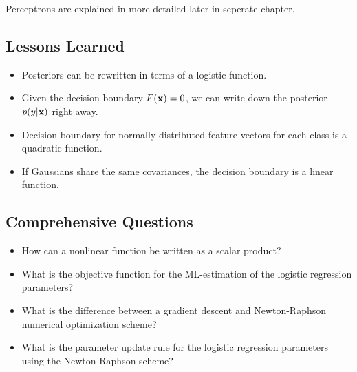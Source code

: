   Perceptrons are explained in more detailed later in seperate chapter. 
 
  \subsection{Lessons Learned}
   \begin{itemize}
    \item Posteriors can be rewritten in terms of a logistic function.
    \item Given the decision boundary $F(\bm{\mathrm{x}})=0$, we can write down the posterior $p(y|\bm{\mathrm{x}})$ right away.
    \item Decision boundary for normally distributed feature vectors for each class is a quadratic function.
    \item If Gaussians share the same covariances, the decision boundary is a linear function.
  \end{itemize}
  
  
\subsection{Comprehensive Questions}
 \begin{itemize}
    \item How can a nonlinear function be written as a scalar product? 
    \item What is the objective function for the ML-estimation of the logistic regression parameters? 
    \item What is the difference between a gradient descent and Newton-Raphson numerical optimization scheme? 
    \item What is the parameter update rule for the logistic regression parameters using the Newton-Raphson scheme?
  \end{itemize}
  \newpage


